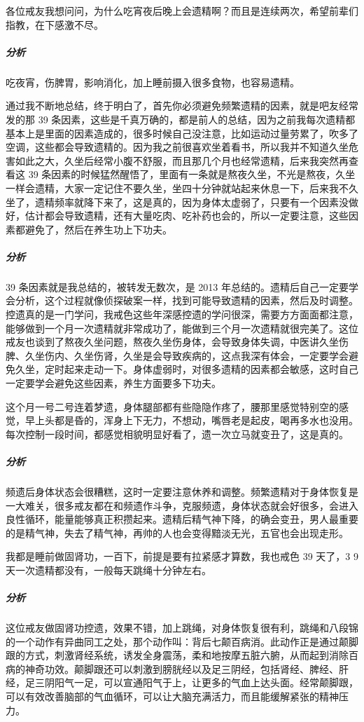\begin{case}
    各位戒友我想问问，为什么吃宵夜后晚上会遗精啊？而且是连续两次，希望前辈们指教，在下感激不尽。
    \subparagraph{分析} 吃夜宵，伤脾胃，影响消化，加上睡前摄入很多食物，也容易遗精。
\end{case}

\begin{case}
    通过我不断地总结，终于明白了，首先你必须避免频繁遗精的因素，就是吧友经常发的那 39 条因素，这些是千真万确的，都是前人的总结，因为之前我每次遗精都基本上是里面的因素造成的，很多时候自己没注意，比如运动过量劳累了，吹多了空调，这些都会导致遗精的。因为我之前很喜欢坐着看书，所以我并不知道久坐危害如此之大，久坐后经常小腹不舒服，而且那几个月也经常遗精，后来我突然再查看这 39 条因素的时候猛然醒悟了，里面有一条就是熬夜久坐，不光是熬夜，久坐一样会遗精，大家一定记住不要久坐，坐四十分钟就站起来休息一下，后来我不久坐了，遗精频率就降下来了，这是真的，因为身体太虚弱了，只要有一个因素没做好，估计都会导致遗精，还有大量吃肉、吃补药也会的，所以一定要注意，这些因素都避免了，然后在养生功上下功夫。
    \subparagraph{分析} 39 条因素就是我总结的，被转发无数次，是 2013 年总结的。遗精后自己一定要学会分析，这个过程就像侦探破案一样，找到可能导致遗精的因素，然后及时调整。控遗真的是一门学问，我戒色这些年深感控遗的学问很深，需要方方面面都注意，能够做到一个月一次遗精就非常成功了，能做到三个月一次遗精就很完美了。这位戒友也谈到了熬夜久坐问题，熬夜久坐伤身体，会导致身体失调，中医讲久坐伤脾、久坐伤内、久坐伤肾，久坐是会导致疾病的，这点我深有体会，一定要学会避免久坐，定时起来走动一下。身体虚弱时，对很多遗精的因素都会敏感，这时自己一定要学会避免这些因素，养生方面要多下功夫。
\end{case}

\begin{case}
    这个月一号二号连着梦遗，身体腿部都有些隐隐作疼了，腰那里感觉特别空的感觉，早上头都是昏的，浑身上下无力，不想动，嘴唇老是起皮，喝再多水也没用。每次控制一段时间，都感觉相貌明显好看了，遗一次立马就变丑了，这是真的。
    \subparagraph{分析} 频遗后身体状态会很糟糕，这时一定要注意休养和调整。频繁遗精对于身体恢复是一大难关，很多戒友都在和频遗作斗争，克服频遗，身体状态就会好很多，会进入良性循环，能量能够真正积攒起来。遗精后精气神下降，的确会变丑，男人最重要的是精气神，失去了精气神，再帅的人也会变得黯淡无光，五官也会出现走形。
\end{case}

\begin{case}
    我都是睡前做固肾功，一百下，前提是要有拉紧感才算数，我也戒色 39 天了，3 9天一次遗精都没有，一般每天跳绳十分钟左右。
    \subparagraph{分析} 这位戒友做固肾功控遗，效果不错，加上跳绳，对身体恢复很有利，跳绳和八段锦的一个动作有异曲同工之处，那个动作叫：背后七颠百病消。此动作正是通过颠脚跟的方式，刺激肾经系统，诱发全身震荡，柔和地按摩五脏六腑，从而起到消除百病的神奇功效。颠脚跟还可以刺激到膀胱经以及足三阴经，包括肾经、脾经、肝经，足三阴阳气一足，可以宣通阳气于上，让更多的气血上达头面。经常颠脚跟，可以有效改善脑部的气血循环，可以让大脑充满活力，而且能缓解紧张的精神压力。
\end{case}

